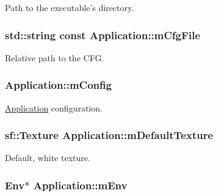 Path to the executable's directory. 

\hypertarget{class_application_a47b102eeb6056257fad1b1073c62cd0e}{
\subsubsection[{m\-Cfg\-File}]{\setlength{\rightskip}{0pt plus 5cm}std\-::string const Application\-::m\-Cfg\-File\hspace{0.3cm}{\ttfamily [private]}}}\label{class_application_a47b102eeb6056257fad1b1073c62cd0e}


Relative path to the C\-F\-G. 

\hypertarget{class_application_a7d54750ac09a1bc7e4d72944bb52e393}{
\subsubsection[{m\-Config}]{ Application\-::m\-Config\hspace{0.3cm}{\ttfamily [private]}}}\label{class_application_a7d54750ac09a1bc7e4d72944bb52e393}


\hyperlink{class_application}{Application} configuration. 

\hypertarget{class_application_a79cda06cffa4e262a9c4ec066726831d}{
\subsubsection[{m\-Default\-Texture}]{\setlength{\rightskip}{0pt plus 5cm}sf\-::\-Texture Application\-::m\-Default\-Texture\hspace{0.3cm}{\ttfamily [private]}}}\label{class_application_a79cda06cffa4e262a9c4ec066726831d}


Default, white texture. 

\hypertarget{class_application_a17edefa78adf28e93132ce3d9af8aad5}{
\subsubsection[{m\-Env}]{\setlength{\rightskip}{0pt plus 5cm}Env$\ast$ Application\-::m\-Env\hspace{0.3cm}{\ttfamily [private]}}}\label{class_application_a17edefa78adf28e93132ce3d9af8aad5}


